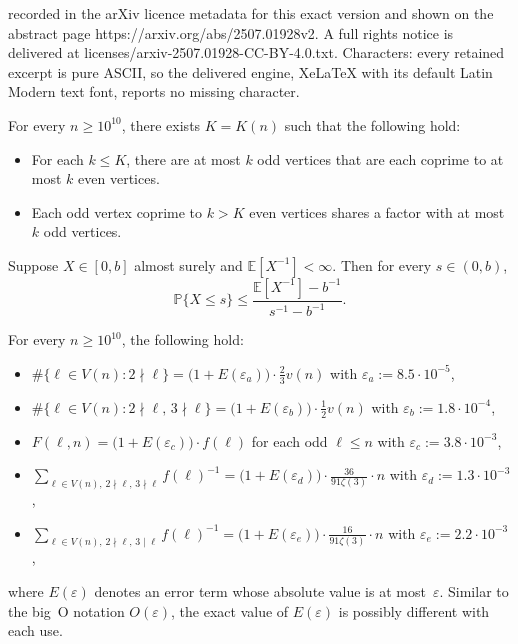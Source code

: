 \documentclass[10pt,a4paper]{amsart}
\begin{document}
recorded in the arXiv licence metadata for this exact version and shown on the abstract page https://arxiv.org/abs/2507.01928v2. A full rights notice is delivered at licenses/arxiv-2507.01928-CC-BY-4.0.txt. Characters: every retained excerpt is pure ASCII, so the delivered engine, XeLaTeX with its default Latin Modern text font, reports no missing character.
\begin{lemma}
\label{lem.main}
For every $n\geq10^{10}$, there exists $K=K(n)$ such that the following hold:
\begin{itemize}
\item[(a)]
For each $k\leq K$, there are at most $k$ odd vertices that are each coprime to at most $k$ even vertices.
\item[(b)]
Each odd vertex coprime to $k>K$ even vertices shares a factor with at most $k$ odd vertices.
\end{itemize}
\end{lemma}

\begin{lemma}
\label{lem.negative moment method}
Suppose $X\in[0,b]$ almost surely and $\mathbb{E}[X^{-1}] < \infty$.
Then for every $s\in(0,b)$,
\[
\mathbb{P}\{X\leq s\}
\leq\frac{\mathbb{E}[X^{-1}]-b^{-1}}{s^{-1}-b^{-1}}.
\]
\end{lemma}

\begin{lemma}
\label{lem.estimates}
For every $n\geq 10^{10}$, the following hold:
\begin{itemize}
\item[(a)]
$\#\{\ell\in V(n):2\nmid\ell\}
=\big(1+E(\varepsilon_a)\big)\cdot\frac{2}{3}v(n)$ with $\varepsilon_a:=8.5\cdot10^{-5}$,
\item[(b)]
$\#\{\ell\in V(n):2\nmid\ell,\,3\nmid\ell\}
=\big(1+E(\varepsilon_b)\big)\cdot\frac{1}{2}v(n)$ with $\varepsilon_b:=1.8\cdot10^{-4}$,
\item[(c)]
$F(\ell,n)
=\big(1+E(\varepsilon_c)\big)\cdot f(\ell)$ for each odd $\ell\leq n$ with $\varepsilon_c:=3.8\cdot10^{-3}$,
\item[(d)]
$\sum_{\ell\in V(n),\,2\nmid\ell,\,3\nmid\ell}f(\ell)^{-1}
=\big(1+E(\varepsilon_d)\big)\cdot\frac{36}{91\zeta(3)}\cdot n$ with $\varepsilon_d:=1.3\cdot10^{-3}$,
\item[(e)]
$\sum_{\ell\in V(n),\,2\nmid\ell,\,3\mid\ell}f(\ell)^{-1}
=\big(1+E(\varepsilon_e)\big)\cdot\frac{16}{91\zeta(3)}\cdot n$ with $\varepsilon_e:=2.2\cdot10^{-3}$,
\end{itemize}
where $E(\varepsilon)$ denotes an error term whose absolute value is at most~$\varepsilon$.
Similar to the big~O notation $O(\varepsilon)$, the exact value of $E(\varepsilon)$ is possibly different with each use.
\end{lemma}
\end{document}
